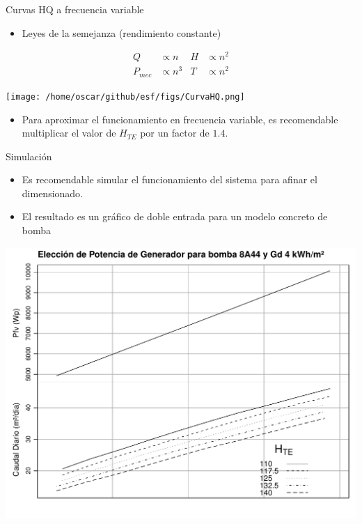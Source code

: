 \documentclass[xcolor={usenames,svgnames,dvipsnames}]{beamer}
\begin{document}
\begin{frame}[label={sec:orgdb577fb}]{Curvas HQ a frecuencia variable}
\begin{itemize}
\item Leyes de la semejanza (rendimiento constante)
\end{itemize}

\begin{align*}
Q &\propto n &H &\propto n^{2}\\
P_{mec} &\propto n^{3} &T &\propto n^{2}
\end{align*}

\begin{center}
\texttt{[image: /home/oscar/github/esf/figs/CurvaHQ.png]}
\end{center}

\begin{itemize}
\item Para aproximar el funcionamiento en frecuencia variable, es recomendable \alert{multiplicar el valor de \(H_{TE}\) por un factor de \(1.4\)}.
\end{itemize}
\end{frame}

\begin{frame}[label={sec:orge43f804}]{Simulación}
\begin{itemize}
\item Es recomendable simular el funcionamiento del sistema para afinar el dimensionado.
\item El resultado es un gráfico de doble entrada para un modelo concreto de bomba
\end{itemize}
\begin{center}
\includegraphics[width=.9\linewidth]{../figs/AbacoBomba.pdf}
\end{center}
\end{frame}
\end{document}
